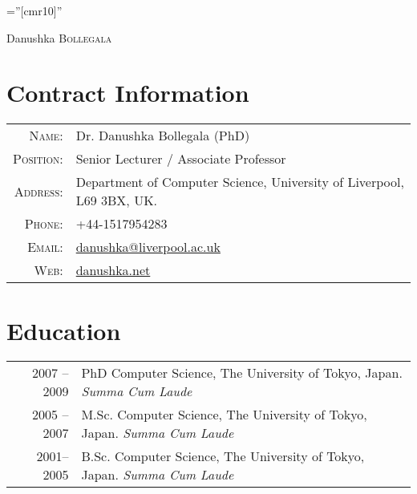 \documentclass[a4paper,11pt]{article}
\begin{document}
\pagestyle{empty} %

\font\fb=''[cmr10]'' %

\par{\centering
		{\Huge Danushka \textsc{Bollegala}
	}\bigskip\par}

\section{Contract Information}

\begin{tabular}{rl}
    \textsc{Name:} & Dr. Danushka Bollegala (PhD)\\
    \textsc{Position:} & Senior Lecturer / Associate Professor\\
    \textsc{Address:}   & Department of Computer Science, University of Liverpool, L69 3BX, UK. \\
    \textsc{Phone:}     & +44-1517954283\\
    \textsc{Email:}     & \href{mailto:danushka@liverpool.ac.uk}{danushka@liverpool.ac.uk} \\
    \textsc{Web:} & \href{http://danushka.net}{danushka.net}
\end{tabular}

\section{Education}
\begin{tabular}{r|p{10cm}}
\textsc{2007 -- 2009} & PhD Computer Science, The University of Tokyo, Japan.  \emph{Summa Cum Laude} \\
\textsc{2005 -- 2007} & M.Sc. Computer Science, The University of Tokyo, Japan. \emph{Summa Cum Laude} \\
\textsc{2001-- 2005} & B.Sc. Computer Science, The University of Tokyo, Japan. \emph{Summa Cum Laude} \\
\end{tabular}
\end{document}
